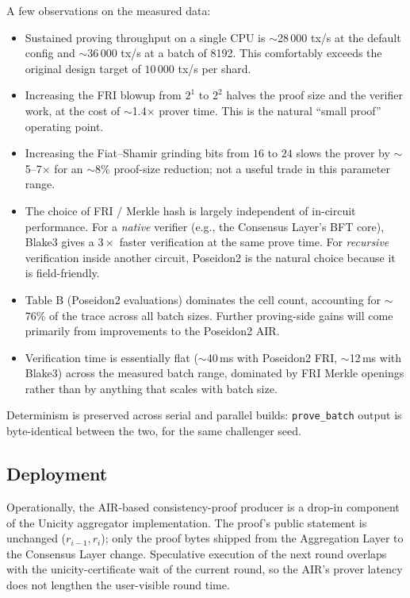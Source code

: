 \documentclass[11pt]{article}
\begin{document}
A few observations on the measured data:

\begin{itemize}[nosep]
    \item Sustained proving throughput on a single CPU is $\sim$28\,000 tx/s at the default config and $\sim$36\,000 tx/s at a batch of 8192. This comfortably exceeds the original design target of $10\,000$ tx/s per shard.
    \item Increasing the FRI blowup from $2^1$ to $2^2$ halves the proof size and the verifier work, at the cost of $\sim$1.4$\times$ prover time. This is the natural ``small proof'' operating point.
    \item Increasing the Fiat--Shamir grinding bits from $16$ to $24$ slows the prover by $\sim$5--7$\times$ for an $\sim$8\% proof-size reduction; not a useful trade in this parameter range.
    \item The choice of FRI / Merkle hash is largely independent of in-circuit performance. For a \emph{native} verifier (e.g., the Consensus Layer's BFT core), Blake3 gives a $3\times$ faster verification at the same prove time. For \emph{recursive} verification inside another circuit, Poseidon2 is the natural choice because it is field-friendly.
    \item Table B (Poseidon2 evaluations) dominates the cell count, accounting for $\sim$76\% of the trace across all batch sizes. Further proving-side gains will come primarily from improvements to the Poseidon2 AIR.
    \item Verification time is essentially flat ($\sim$40\,ms with Poseidon2 FRI, $\sim$12\,ms with Blake3) across the measured batch range, dominated by FRI Merkle openings rather than by anything that scales with batch size.
\end{itemize}

Determinism is preserved across serial and parallel builds: \texttt{prove\_batch} output is byte-identical between the two, for the same challenger seed.

\subsection{Deployment}

Operationally, the AIR-based consistency-proof producer is a drop-in component of the Unicity aggregator implementation. The proof's public statement is unchanged ($r_{i-1}, r_i$); only the proof bytes shipped from the Aggregation Layer to the Consensus Layer change. Speculative execution of the next round overlaps with the unicity-certificate wait of the current round, so the AIR's prover latency does not lengthen the user-visible round time.
\end{document}
